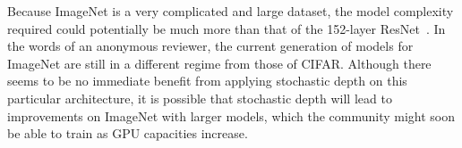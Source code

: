 Because ImageNet is a very complicated and large dataset, the model complexity required could potentially be much more than that of the 152-layer ResNet~\cite{he2016identity}. In the words of an anonymous reviewer, the current generation of models for ImageNet are still in a different regime from those of CIFAR. Although there seems to be no immediate benefit from applying stochastic depth on this particular architecture, it is possible that stochastic depth will lead to improvements on ImageNet with larger models, which the community might soon be able to train as GPU capacities increase.
